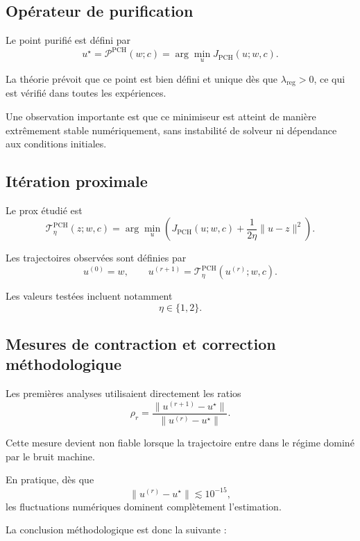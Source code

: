 \documentclass[11pt,a4paper]{article}
\newcommand{\1}{\mathbf 1}
\begin{document}
\subsection{Opérateur de purification}

Le point purifié est défini par
\[
u^\star = \mathcal P^{\mathrm{PCH}}(w;c)
=
\arg\min_u J_{\mathrm{PCH}}(u;w,c).
\]

La théorie prévoit que ce point est bien défini et unique dès que \(\lambda_{\mathrm{reg}}>0\), ce qui est vérifié dans toutes les expériences.

Une observation importante est que ce minimiseur est atteint de manière extrêmement stable numériquement, sans instabilité de solveur ni dépendance aux conditions initiales.

\subsection{Itération proximale}

Le prox étudié est
\[
\mathcal T_\eta^{\mathrm{PCH}}(z;w,c)
=
\arg\min_u
\left(
J_{\mathrm{PCH}}(u;w,c)
+
\frac1{2\eta}\|u-z\|^2
\right).
\]

Les trajectoires observées sont définies par
\[
u^{(0)} = w,
\qquad
u^{(r+1)} = \mathcal T_\eta^{\mathrm{PCH}}(u^{(r)};w,c).
\]

Les valeurs testées incluent notamment
\[
\eta \in \{1,2\}.
\]

\subsection{Mesures de contraction et correction méthodologique}

Les premières analyses utilisaient directement les ratios
\[
\rho_r
=
\frac{\|u^{(r+1)}-u^\star\|}{\|u^{(r)}-u^\star\|}.
\]

Cette mesure devient non fiable lorsque la trajectoire entre dans le régime dominé par le bruit machine.

En pratique, dès que
\[
\|u^{(r)}-u^\star\| \lesssim 10^{-15},
\]
les fluctuations numériques dominent complètement l’estimation.

La conclusion méthodologique est donc la suivante :
\end{document}
